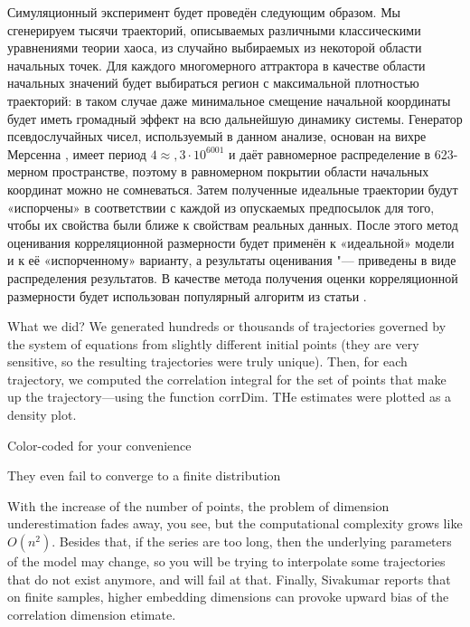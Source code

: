 \documentclass[final,pdftex]{../../template/epsilonj}
\begin{document}
Симуляционный эксперимент будет проведён следующим образом. Мы сгенерируем тысячи траекторий, описываемых различными классическими уравнениями теории хаоса, из случайно выбираемых из некоторой области начальных точек. Для каждого многомерного аттрактора в качестве области начальных значений будет выбираться регион с максимальной плотностью траекторий: в таком случае даже минимальное смещение начальной координаты будет иметь громадный эффект на всю дальнейшую динамику системы. Генератор псевдослучайных чисел, используемый в данном анализе, основан на вихре Мерсенна \citep{matsumoto1998mersenne}, имеет период $4\approx{,}3\cdot 10^{6001}$ и даёт равномерное распределение в 623-мерном пространстве, поэтому в равномерном покрытии области начальных координат можно не сомневаться. Затем полученные идеальные траектории будут «испорчены» в соответствии с каждой из опускаемых предпосылок для того, чтобы их свойства были ближе к свойствам реальных данных. После этого метод оценивания корреляционной размерности будет применён к «идеальной» модели и к её «испорченному» варианту, а результаты оценивания "--- приведены в виде распределения результатов. В качестве метода получения оценки корреляционной размерности будет использован популярный алгоритм из статьи \citet{grassberger1983measuring}. 

What we did? We generated hundreds or thousands of trajectories governed by the system of equations from slightly different initial points (they are very sensitive, so the resulting trajectories were truly unique). Then, for each trajectory, we computed the correlation integral for the set of points that make up the trajectory---using the function corrDim. THe estimates were plotted as a density plot.

Color-coded for your convenience

They even fail to converge to a finite distribution

With the increase of the number of points, the problem of dimension underestimation fades away, you see, but the computational complexity grows like $O(n^2)$. Besides that, if the series are too long, then the underlying parameters of the model may change, so you will be trying to interpolate some trajectories that do not exist anymore, and will fail at that. Finally, Sivakumar reports that on finite samples, higher embedding dimensions can provoke upward bias of the correlation dimension etimate.
\end{document}
